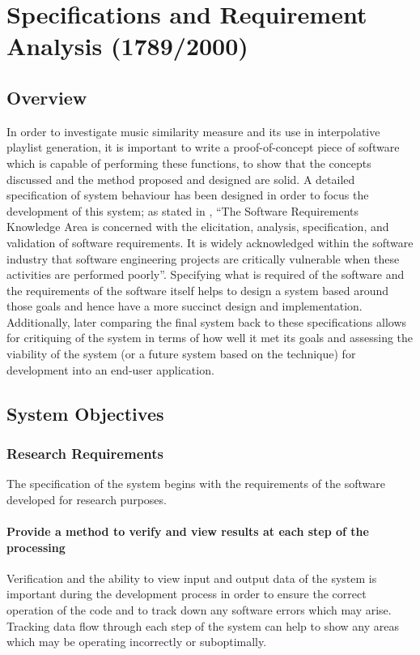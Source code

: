 %
%
\newcommand{\objective}[1]{
	\subsubsection{#1}
}
\chapter{Specifications and Requirement Analysis (1789/2000)}
\section{Overview}
In order to investigate music similarity measure and its use in interpolative playlist generation, it is important to write a proof-of-concept piece of software which is capable of performing these functions, to show that the concepts discussed and the method proposed and designed are solid. A detailed specification of system behaviour has been designed in order to focus the development of this system; as stated in \citet{Bourque2004}, ``The Software Requirements Knowledge Area is concerned with the elicitation, analysis, specification, and validation of software requirements. It is widely acknowledged within the software industry that software engineering projects are critically vulnerable when these activities are performed poorly''. Specifying what is required of the software and the requirements of the software itself helps to design a system based around those goals and hence have a more succinct design and implementation. Additionally, later comparing the final system back to these specifications allows for critiquing of the system in terms of how well it met its goals and  assessing the viability of the system (or a future system based on the technique) for development into an end-user application.
\section{System Objectives}
\subsection{Research Requirements}
The specification of the system begins with the requirements of the software developed for research purposes. 
\objective{Provide a method to verify and view results at each step of the processing}
Verification and the ability to view input and output data of the system is important during the development process in order to ensure the correct operation of the code and to track down any software errors which may arise. Tracking data flow through each step of the system can help to show any areas which may be operating incorrectly or suboptimally.

